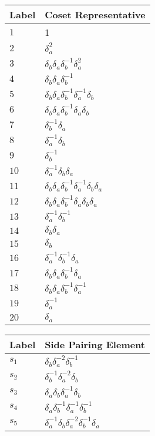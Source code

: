 \documentclass{article}
\begin{document}

\begin{center}
\begin{tabular}{ll}
\toprule
Label & Coset Representative\\
\midrule
$1$ & 1 \\
$2$ & $\delta_a^{2}$ \\
$3$ & $\delta_b^{}\delta_a^{}\delta_b^{-1}\delta_a^{2}$ \\
$4$ & $\delta_b^{}\delta_a^{}\delta_b^{-1}$ \\
$5$ & $\delta_b^{}\delta_a^{}\delta_b^{-1}\delta_a^{-1}\delta_b^{}$ \\
$6$ & $\delta_b^{}\delta_a^{}\delta_b^{-1}\delta_a^{}\delta_b^{}$ \\
$7$ & $\delta_b^{-1}\delta_a^{}$ \\
$8$ & $\delta_a^{-1}\delta_b^{}$ \\
$9$ & $\delta_b^{-1}$ \\
$10$ & $\delta_a^{-1}\delta_b^{}\delta_a^{}$ \\
$11$ & $\delta_b^{}\delta_a^{}\delta_b^{-1}\delta_a^{-1}\delta_b^{}\delta_a^{}$ 
\\
$12$ & $\delta_b^{}\delta_a^{}\delta_b^{-1}\delta_a^{}\delta_b^{}\delta_a^{}$ \\
$13$ & $\delta_a^{-1}\delta_b^{-1}$ \\
$14$ & $\delta_b^{}\delta_a^{}$ \\
$15$ & $\delta_b^{}$ \\
$16$ & $\delta_a^{-1}\delta_b^{-1}\delta_a^{}$ \\
$17$ & $\delta_b^{}\delta_a^{}\delta_b^{-1}\delta_a^{}$ \\
$18$ & $\delta_b^{}\delta_a^{}\delta_b^{-1}\delta_a^{-1}$ \\
$19$ & $\delta_a^{-1}$ \\
$20$ & $\delta_a^{}$ \\
\bottomrule
\end{tabular}
\hfill
\begin{tabular}{ll}
\toprule
Label & Side Pairing Element\\
\midrule
$s_{1}$ & $\delta_b^{}\delta_a^{-2}\delta_b^{-1}$ \\
$s_{2}$ & $\delta_b^{-1}\delta_a^{-2}\delta_b^{}$ \\
$s_{3}$ & $\delta_a^{}\delta_b^{}\delta_a^{-1}\delta_b^{}$ \\
$s_{4}$ & $\delta_a^{}\delta_b^{-1}\delta_a^{-1}\delta_b^{-1}$ \\
$s_{5}$ & $\delta_a^{-1}\delta_b^{}\delta_a^{-2}\delta_b^{-1}\delta_a^{}$ \\

\end{tabular}
\end{center}
\end{document}
